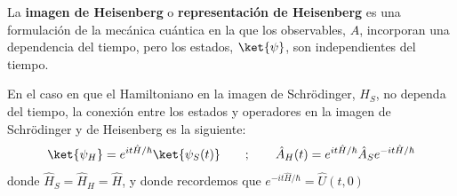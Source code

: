 
        La \textbf{imagen de Heisenberg} o \textbf{representación de Heisenberg} es una formulación de la mecánica cuántica en la que los observables, $A$, incorporan una dependencia del tiempo, pero los estados, $\ket{\psi}$, son independientes del tiempo.

        En el caso en que el Hamiltoniano en la imagen de Schrödinger, $H_S$, no dependa del tiempo, la conexión entre los estados y operadores en la imagen de Schrödinger y de Heisenberg es la siguiente:
        \begin{equation}
            \ket{\psi_H} = e^{it \hat{H}/\hbar} \ket{\psi_S(t)} 
            \qquad; \qquad
            \hat{A}_H(t) = e^{it \hat{H}/\hbar} \hat{A}_S e^{-it \hat{H}/\hbar}
        \end{equation}
        donde $\hat{H}_S = \hat{H}_H = \hat{H}$, y donde recordemos que $e^{-it \hat{H}/\hbar} = \hat{U}(t,0)$

